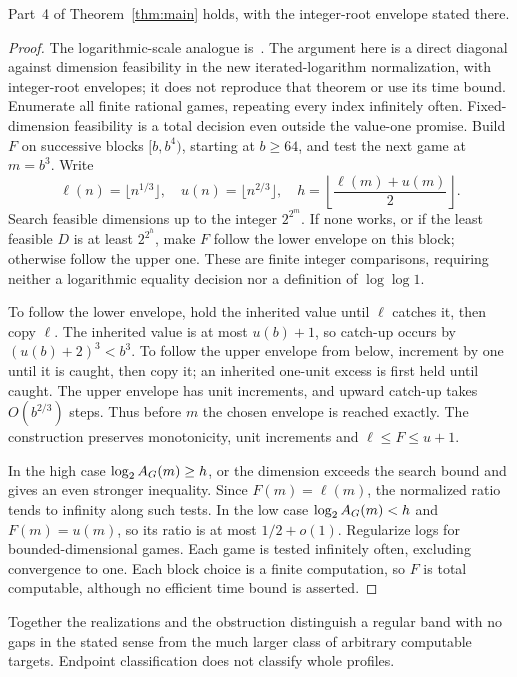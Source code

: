 \begin{theorem}\label{thm:wall}
Part~4 of Theorem~\ref{thm:main} holds, with the integer-root envelope stated there.
\end{theorem}
\begin{proof}
The logarithmic-scale analogue is~\cite[Theorem Q7.2]{UP}. The argument here is a direct diagonal against dimension feasibility in the new iterated-logarithm normalization, with integer-root envelopes; it does not reproduce that theorem or use its time bound. Enumerate all finite rational games, repeating every index infinitely often. Fixed-dimension feasibility is a total decision even outside the value-one promise. Build $F$ on successive blocks $[b,b^4)$, starting at $b\ge64$, and test the next game at $m=b^3$. Write
\[
 \ell(n)=\lfloor n^{1/3}\rfloor,\quad u(n)=\lfloor n^{2/3}\rfloor,
 \quad h=\left\lfloor\frac{\ell(m)+u(m)}2\right\rfloor.
\]
Search feasible dimensions up to the integer $2^{2^m}$. If none works, or if the least feasible $D$ is at least $2^{2^h}$, make $F$ follow the lower envelope on this block; otherwise follow the upper one. These are finite integer comparisons, requiring neither a logarithmic equality decision nor a definition of $\log\log1$.

To follow the lower envelope, hold the inherited value until $\ell$ catches it, then copy $\ell$. The inherited value is at most $u(b)+1$, so catch-up occurs by $(u(b)+2)^3<b^3$. To follow the upper envelope from below, increment by one until it is caught, then copy it; an inherited one-unit excess is first held until caught. The upper envelope has unit increments, and upward catch-up takes $O(b^{2/3})$ steps. Thus before $m$ the chosen envelope is reached exactly. The construction preserves monotonicity, unit increments and $\ell\le F\le u+1$.

In the high case $\log_2 A_G(m)\ge h$, or the dimension exceeds the search bound and gives an even stronger inequality. Since $F(m)=\ell(m)$, the normalized ratio tends to infinity along such tests. In the low case $\log_2 A_G(m)<h$ and $F(m)=u(m)$, so its ratio is at most $1/2+o(1)$. Regularize logs for bounded-dimensional games. Each game is tested infinitely often, excluding convergence to one. Each block choice is a finite computation, so $F$ is total computable, although no efficient time bound is asserted.
\end{proof}

Together the realizations and the obstruction distinguish a regular band with no gaps in the stated sense from the much larger class of arbitrary computable targets. Endpoint classification does not classify whole profiles.
